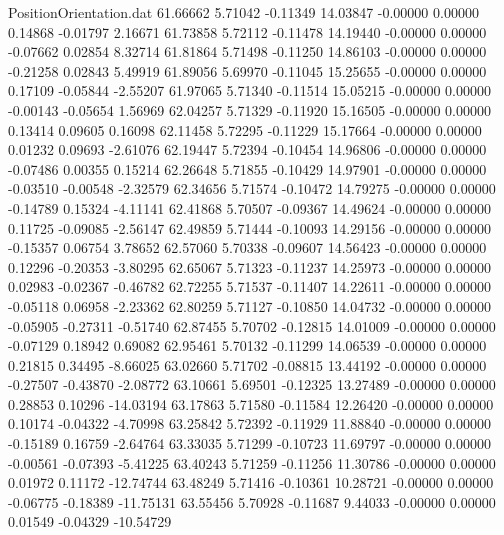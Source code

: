\begin{filecontents}{PositionOrientation.dat}
  61.66662    5.71042   -0.11349    14.03847   -0.00000    0.00000    0.14868   -0.01797    2.16671
  61.73858    5.72112   -0.11478    14.19440   -0.00000    0.00000   -0.07662    0.02854    8.32714
  61.81864    5.71498   -0.11250    14.86103   -0.00000    0.00000   -0.21258    0.02843    5.49919
  61.89056    5.69970   -0.11045    15.25655   -0.00000    0.00000    0.17109   -0.05844   -2.55207
  61.97065    5.71340   -0.11514    15.05215   -0.00000    0.00000   -0.00143   -0.05654    1.56969
  62.04257    5.71329   -0.11920    15.16505   -0.00000    0.00000    0.13414    0.09605    0.16098
  62.11458    5.72295   -0.11229    15.17664   -0.00000    0.00000    0.01232    0.09693   -2.61076
  62.19447    5.72394   -0.10454    14.96806   -0.00000    0.00000   -0.07486    0.00355    0.15214
  62.26648    5.71855   -0.10429    14.97901   -0.00000    0.00000   -0.03510   -0.00548   -2.32579
  62.34656    5.71574   -0.10472    14.79275   -0.00000    0.00000   -0.14789    0.15324   -4.11141
  62.41868    5.70507   -0.09367    14.49624   -0.00000    0.00000    0.11725   -0.09085   -2.56147
  62.49859    5.71444   -0.10093    14.29156   -0.00000    0.00000   -0.15357    0.06754    3.78652
  62.57060    5.70338   -0.09607    14.56423   -0.00000    0.00000    0.12296   -0.20353   -3.80295
  62.65067    5.71323   -0.11237    14.25973   -0.00000    0.00000    0.02983   -0.02367   -0.46782
  62.72255    5.71537   -0.11407    14.22611   -0.00000    0.00000   -0.05118    0.06958   -2.23362
  62.80259    5.71127   -0.10850    14.04732   -0.00000    0.00000   -0.05905   -0.27311   -0.51740
  62.87455    5.70702   -0.12815    14.01009   -0.00000    0.00000   -0.07129    0.18942    0.69082
  62.95461    5.70132   -0.11299    14.06539   -0.00000    0.00000    0.21815    0.34495   -8.66025
  63.02660    5.71702   -0.08815    13.44192   -0.00000    0.00000   -0.27507   -0.43870   -2.08772
  63.10661    5.69501   -0.12325    13.27489   -0.00000    0.00000    0.28853    0.10296  -14.03194
  63.17863    5.71580   -0.11584    12.26420   -0.00000    0.00000    0.10174   -0.04322   -4.70998
  63.25842    5.72392   -0.11929    11.88840   -0.00000    0.00000   -0.15189    0.16759   -2.64764
  63.33035    5.71299   -0.10723    11.69797   -0.00000    0.00000   -0.00561   -0.07393   -5.41225
  63.40243    5.71259   -0.11256    11.30786   -0.00000    0.00000    0.01972    0.11172  -12.74744
  63.48249    5.71416   -0.10361    10.28721   -0.00000    0.00000   -0.06775   -0.18389  -11.75131
  63.55456    5.70928   -0.11687     9.44033   -0.00000    0.00000    0.01549   -0.04329  -10.54729

\end{filecontents}
